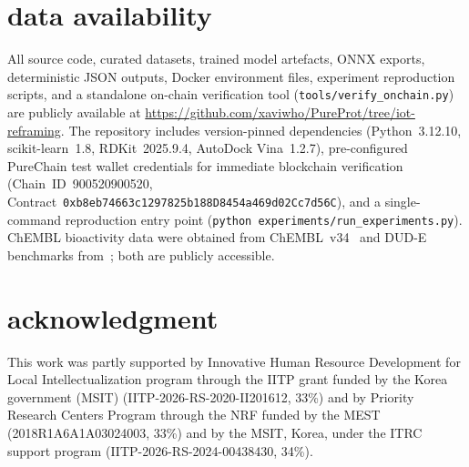 \documentclass[conference]{IEEEtran}
\begin{document}
\sloppy
\section*{\textbf{data availability}}

All source code, curated datasets, trained model artefacts,
ONNX exports, deterministic JSON outputs, Docker environment
files, experiment reproduction scripts, and a standalone
on-chain verification tool
(\texttt{tools/verify\_onchain.py}) are publicly available
at \url{https://github.com/xaviwho/PureProt/tree/iot-reframing}.
The repository includes version-pinned dependencies
(Python~3.12.10, scikit-learn~1.8, RDKit~2025.9.4,
AutoDock Vina~1.2.7), pre-configured PureChain test wallet
credentials for immediate blockchain verification
(Chain~ID~900520900520,
Contract~\texttt{0xb8eb74663c1297825b18\allowbreak 8D8454a469d02Cc7d56C}),
and a single-command reproduction entry point
(\texttt{python experiments/run\_experiments.py}).
ChEMBL bioactivity data were obtained from
ChEMBL~v34~\cite{mendez2019chembl} and DUD-E benchmarks
from~\cite{mysinger2012directory}; both are publicly
accessible.


\section *{\textbf{acknowledgment}} 
This work was partly supported by Innovative Human Resource Development for Local Intellectualization program through the IITP grant funded by the Korea government (MSIT) (IITP-2026-RS-2020-II201612, 33\%) and by Priority Research Centers Program through the NRF funded by the MEST (2018R1A6A1A03024003, 33\%) and by the MSIT, Korea, under the ITRC support program (IITP-2026-RS-2024-00438430, 34\%).

\balance



\end{document}
